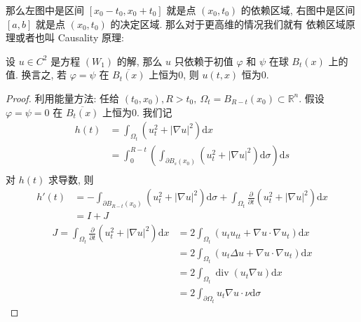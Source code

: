 \documentclass[11pt]{ctexart}[UTF8]
\begin{document}
那么左图中是区间 $[x_0-t_0, x_0+t_0]$ 就是点 $(x_0,t_0)$ 的依赖区域, 右图中是区间 $[a,b]$ 就是点 $(x_0,t_0)$ 的决定区域. 那么对于更高维的情况我们就有
依赖区域原理或者也叫 Causality 原理:
\begin{theorem}
    设 $u \in C^{2}$ 是方程 $(W_{1})$ 的解, 那么 $u$ 只依赖于初值 $\varphi$ 和 $\psi$ 在球 $B_{t}(x)$ 上的值. 换言之, 若
    $\varphi=\psi$ 在 $\overline{B_{t}(x)}$ 上恒为0, 则 $u(t,x)$ 恒为0.
\end{theorem}
\begin{proof}
    利用能量方法: 任给 $(t_{0}, x_{0}), R>t_{0},\ \Omega_{t} = B_{R-t}(x_{0})\subset \mathbb{R}^{n}$. 假设 $\varphi = \psi = 0$ 在 $\overline{B_{t}(x)}$ 上恒为0. 我们记
    \begin{equation*}
        \begin{aligned}
            h(t) &= \int_{\Omega_{t}} \left(u_{t}^2 + |\nabla u|^2 \right) \mathrm{d}x\\
                 &=\int_{0}^{R-t}\left( \int_{\partial B_{s}(x_{0})} \left( u_{t}^{2} + |\nabla u|^2 \right)\mathrm{d}\sigma \right)\mathrm{d}s\\
        \end{aligned}
    \end{equation*}
    对 $h(t)$ 求导数, 则
    \begin{equation*}
        \begin{aligned}
            h'(t) &= -\int_{\partial B_{R-t}(x_{0})} \left( u_{t}^{2} + |\nabla u|^2 \right)\mathrm{d}\sigma + \int_{\Omega_{t}} \frac{\partial}{\partial t}\left( u_{t}^{2}+ |\nabla u|^{2} \right)\mathrm{d}x\\
                  &= I+J
        \end{aligned}
    \end{equation*}
    \begin{equation*}
        \begin{aligned}
            J = \int_{\Omega_{t}} \frac{\partial}{\partial t}\left( u_{t}^{2}+ |\nabla u|^{2} \right)\mathrm{d}x &= 2\int_{\Omega_{t}} \left( u_{t}u_{tt} + \nabla u \cdot \nabla u_{t} \right) \mathrm{d}x\\
            &= 2\int_{\Omega_{t}} \left( u_{t}\Delta u + \nabla u \cdot \nabla u_{t} \right) \mathrm{d}x\\
            &= 2\int_{\Omega_{t}} \operatorname{div}(u_{t} \nabla u) \mathrm{d}x\\
            &= 2\int_{\partial \Omega_{t}} u_{t} \nabla u \cdot \nu \mathrm{d}\sigma
        \end{aligned}

\end{equation*}
\end{proof}
\end{document}
